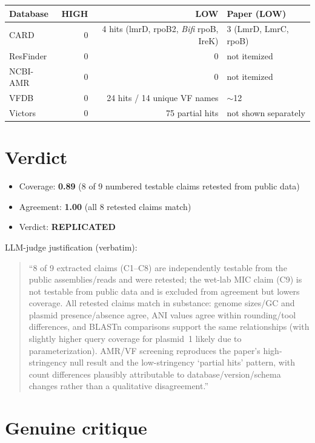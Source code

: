 \documentclass[11pt,letterpaper]{article}
\begin{document}
\begin{tabular}{@{}lrrl@{}}
\toprule
Database   & HIGH & LOW & Paper (LOW) \\
\midrule
CARD       & 0 & 4 hits (lmrD, rpoB2, \textit{Bifi} rpoB, IreK) & 3 (LmrD, LmrC, rpoB) \\
ResFinder  & 0 & 0 & not itemized \\
NCBI-AMR   & 0 & 0 & not itemized \\
VFDB       & 0 & 24 hits / 14 unique VF names & $\sim$12 \\
Victors    & 0 & 75 partial hits & not shown separately \\
\bottomrule
\end{tabular}

\section{Verdict}

\begin{itemize}[nosep]
  \item Coverage: \textbf{0.89} (8 of 9 numbered testable claims retested from public data)
  \item Agreement: \textbf{1.00} (all 8 retested claims match)
  \item Verdict: \textbf{REPLICATED}
\end{itemize}

LLM-judge justification (verbatim):
\begin{quote}\small
``8 of 9 extracted claims (C1--C8) are independently testable from the public assemblies/reads
and were retested; the wet-lab MIC claim (C9) is not testable from public data and is excluded
from agreement but lowers coverage. All retested claims match in substance: genome sizes/GC and
plasmid presence/absence agree, ANI values agree within rounding/tool differences, and BLASTn
comparisons support the same relationships (with slightly higher query coverage for plasmid~1
likely due to parameterization). AMR/VF screening reproduces the paper's high-stringency null
result and the low-stringency `partial hits' pattern, with count differences plausibly attributable
to database/version/schema changes rather than a qualitative disagreement.''
\end{quote}

\section{Genuine critique}\label{sec:critique}
\end{document}
